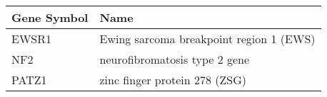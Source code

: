 \begin{tabular}{ll}
\toprule
Gene Symbol &                                    Name \\
\midrule
      EWSR1 & Ewing sarcoma breakpoint region 1 (EWS) \\
        NF2 &           neurofibromatosis type 2 gene \\
      PATZ1 &           zinc finger protein 278 (ZSG) \\
\bottomrule
\end{tabular}
